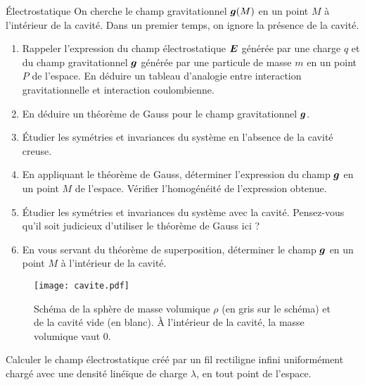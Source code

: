 \begin{td}{Électrostatique}
On cherche le champ gravitationnel $\vecg(M)$ en un point $M$ 
à l'intérieur de la cavité.
Dans un premier temps, on ignore la présence de la cavité.
\begin{enumerate}
	\item Rappeler l'expression du champ électrostatique $\vece$ générée par une
	  charge $q$ et du champ gravitationnel $\vecg$ générée par une particule
	  de masse $m$ en un point $P$ de l'espace. 
	  En déduire un tableau d'analogie entre interaction
	  gravitationnelle et interaction coulombienne.
  	\item En déduire un théorème de Gauss pour le champ gravitationnel
	  $\vecg$.
	\item Étudier les symétries et invariances du système en l'absence de
	  la cavité creuse.
	\item En appliquant le théorème de Gauss, déterminer l'expression
	  du champ $\vecg$ en un point $M$ de l'espace.
	  Vérifier l'homogénéité de l'expression obtenue.
	\item Étudier les symétries et invariances du système avec la cavité.
	  Pensez-vous qu'il soit judicieux d'utiliser le théorème de Gauss
	  ici ?
	\item En vous servant du théorème de superposition, 
	  déterminer le champ $\vecg$ en un point $M$ à l'intérieur de la cavité.
\end{enumerate}

\begin{figure}[h!]
\centering
\texttt{[image: cavite.pdf]}
\caption{Schéma de la sphère de masse volumique $\rho$ (en gris sur le schéma) 
	 et de la cavité vide (en blanc).
         À l'intérieur de la cavité, la masse volumique vaut 0.}
\label{fig:cavite}
\end{figure}

	Calculer le champ électrostatique créé par un fil rectiligne infini
	uniformément chargé avec une densité linéïque de charge $\lambda$, en 
	tout point de l'espace.

\end{td}

